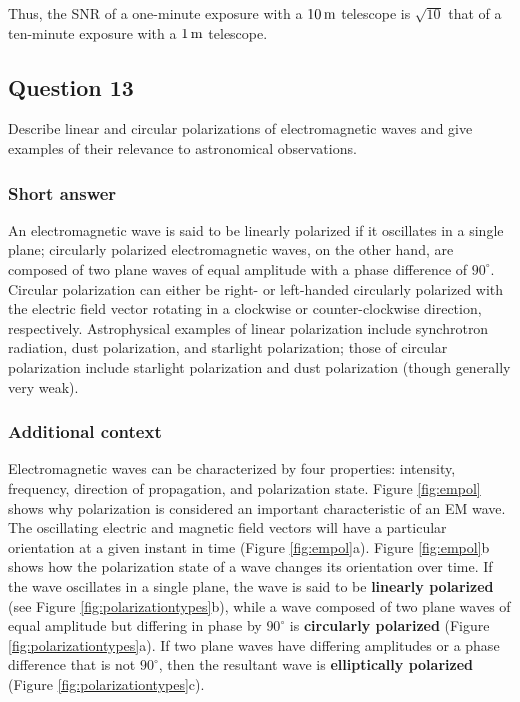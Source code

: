 \documentclass[a4paper,10pt]{article}
\begin{document}
{\noindent}Thus, the SNR of a one-minute exposure with a $10\,{\rm m}$ telescope is $\sqrt{10}$ that of a ten-minute exposure with a $1\,{\rm m}$ telescope.


\newpage
\subsection{Question 13}

Describe linear and circular polarizations of electromagnetic waves and give examples of their relevance to astronomical observations.

\subsubsection{Short answer}

An electromagnetic wave is said to be linearly polarized if it oscillates in a single plane; circularly polarized electromagnetic waves, on the other hand, are composed of two plane waves of equal amplitude with a phase difference of $90^\circ$. Circular polarization can either be right- or left-handed circularly polarized with the electric field vector rotating in a clockwise or counter-clockwise direction, respectively. Astrophysical examples of linear polarization include synchrotron radiation, dust polarization, and starlight polarization; those of circular polarization include starlight polarization and dust polarization (though generally very weak).

\subsubsection{Additional context}

{\noindent}Electromagnetic waves can be characterized by four properties: intensity, frequency, direction of propagation, and polarization state. Figure \ref{fig:empol} shows why polarization is considered an important characteristic of an EM wave. The oscillating electric and magnetic field vectors will have a particular orientation at a given instant in time (Figure \ref{fig:empol}a). Figure \ref{fig:empol}b shows how the polarization state of a wave changes its orientation over time. If the wave oscillates in a single plane, the wave is said to be \textbf{linearly polarized} (see Figure \ref{fig:polarizationtypes}b), while a wave composed of two plane waves of equal amplitude but differing in phase by $90^\circ$ is \textbf{circularly polarized} (Figure \ref{fig:polarizationtypes}a). If two plane waves have differing amplitudes or a phase difference that is not $90^\circ$, then the resultant wave is \textbf{elliptically polarized} (Figure \ref{fig:polarizationtypes}c).
\end{document}

